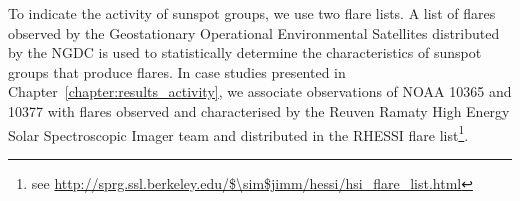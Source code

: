 To indicate the activity of sunspot groups, we use two flare lists. A list of flares observed by the Geostationary Operational Environmental Satellites \citep[GOES;][]{Hanser:1996} distributed by the \gls{NGDC} is used to statistically determine the characteristics of sunspot groups that produce flares. In case studies presented in Chapter~\ref{chapter:results_activity}, we associate observations of \gls{NOAA} 10365 and 10377 with flares observed and characterised by the Reuven Ramaty High Energy Solar Spectroscopic Imager \citep[RHESSI;][]{Lin:2002} team and distributed in the RHESSI flare list\footnote{see \url{http://sprg.ssl.berkeley.edu/$\sim$jimm/hessi/hsi_flare_list.html}}.






